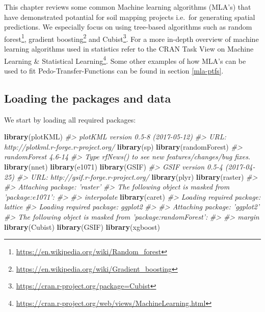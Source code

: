 \documentclass[graybox,natbib,nospthms,UStrade]{svmono}
\newenvironment{Shaded}{\begin{snugshade}}{\end{snugshade}}
\newcommand{\CommentTok}[1]{\textcolor[rgb]{0.37,0.37,0.37}{\textit{#1}}}
\newcommand{\KeywordTok}[1]{\textcolor[rgb]{0.27,0.27,0.27}{\textbf{#1}}}
\newcommand{\NormalTok}[1]{#1}
\renewcommand{\href}[2]{#2 (\url{#1})}
\renewcommand{\href}[2]{#2\footnote{\url{#1}}}
\begin{document}
This chapter reviews some common Machine learning algorithms (MLA's) that have demonstrated potantial for soil mapping projects i.e.~for generating spatial predictions. We especially focus on using tree-based algorithms such as \href{https://en.wikipedia.org/wiki/Random_forest}{random forest}, \href{https://en.wikipedia.org/wiki/Gradient_boosting}{gradient boosting} and \href{https://cran.r-project.org/package=Cubist}{Cubist}. For a more in-depth overview of machine learning algorithms used in statistics refer to the CRAN Task View on \href{https://cran.r-project.org/web/views/MachineLearning.html}{Machine Learning \& Statistical Learning}. Some other examples of how MLA's can be used to fit Pedo-Transfer-Functions can be found in section \ref{mla-ptfs}.

\hypertarget{loading-the-packages-and-data}{%
\subsection{Loading the packages and data}\label{loading-the-packages-and-data}}

We start by loading all required packages:

\begin{Shaded}
\begin{Highlighting}[]
\KeywordTok{library}\NormalTok{(plotKML)}
\CommentTok{#> plotKML version 0.5-8 (2017-05-12)}
\CommentTok{#> URL: http://plotkml.r-forge.r-project.org/}
\KeywordTok{library}\NormalTok{(sp)}
\KeywordTok{library}\NormalTok{(randomForest)}
\CommentTok{#> randomForest 4.6-14}
\CommentTok{#> Type rfNews() to see new features/changes/bug fixes.}
\KeywordTok{library}\NormalTok{(nnet)}
\KeywordTok{library}\NormalTok{(e1071)}
\KeywordTok{library}\NormalTok{(GSIF)}
\CommentTok{#> GSIF version 0.5-4 (2017-04-25)}
\CommentTok{#> URL: http://gsif.r-forge.r-project.org/}
\KeywordTok{library}\NormalTok{(plyr)}
\KeywordTok{library}\NormalTok{(raster)}
\CommentTok{#> }
\CommentTok{#> Attaching package: 'raster'}
\CommentTok{#> The following object is masked from 'package:e1071':}
\CommentTok{#> }
\CommentTok{#>     interpolate}
\KeywordTok{library}\NormalTok{(caret)}
\CommentTok{#> Loading required package: lattice}
\CommentTok{#> Loading required package: ggplot2}
\CommentTok{#> }
\CommentTok{#> Attaching package: 'ggplot2'}
\CommentTok{#> The following object is masked from 'package:randomForest':}
\CommentTok{#> }
\CommentTok{#>     margin}
\KeywordTok{library}\NormalTok{(Cubist)}
\KeywordTok{library}\NormalTok{(GSIF)}
\KeywordTok{library}\NormalTok{(xgboost)}
\end{Highlighting}
\end{Shaded}
\end{document}
